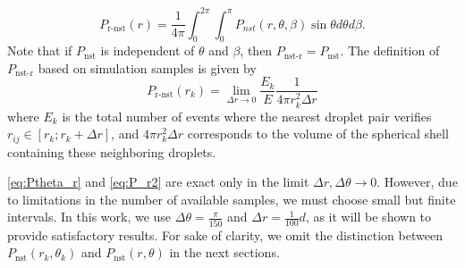 \begin{equation}
    P_\text{r-nst}(r) = \frac{1}{4\pi }\int_{0}^{2\pi}\int_{0}^{\pi} P_{nst}(r,\theta ,\beta) \sin\theta d\theta d\beta.
    \label{eq:P_r}
\end{equation}
Note that if $P_\text{nst}$ is independent of $\theta$ and $\beta$, then $P_\text{nst-r} = P_\text{nst}$. 
The definition of $P_\text{nst-r}$ based on simulation samples is given by 
\begin{equation}
    P_\text{r-nst}(r_k)
    =
    \lim_{\Delta r \to 0}
    \frac{E_k}{E}
    \frac{1}{4\pi  r_k^2  \Delta r }
    \label{eq:P_r2}
\end{equation}
where $E_k$ is the total number of events where the nearest droplet pair verifies $r_{ij} \in [r_k ; r_k + \Delta r]$, and $4\pi  r_k^2  \Delta r$ corresponds to the volume of the spherical shell containing these neighboring droplets. 

\ref{eq:Ptheta_r} and \ref{eq:P_r2} are exact only in the limit $\Delta r,\Delta \theta  \to 0$. 
However, due to limitations in the number of available samples, we must choose small but finite intervals.
In this work, we use $\Delta \theta = \frac{\pi}{150}$ and $\Delta r = \frac{1}{100}d$, as it will be shown to provide satisfactory results. 
For sake of clarity, we omit the distinction between $P_\text{nst}(r_k,\theta_k)$ and $P_\text{nst}(r,\theta)$ in the next sections. 